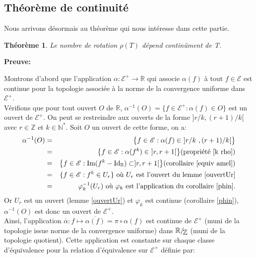 \documentclass[11pt,a4 paper]{article}
\newtheorem{theoreme}{Théorème}[section]
\newcommand{\Rbb}{\mathbb{R}}
\newcommand*{\EnsembleQuotient}[2]%
{\ensuremath{%
		#1/\!\raisebox{-.65ex}{\ensuremath{\mathcal{#2}}}}}
\newenvironment{thm}{\begin{box_thm}\begin{theoreme}}{\end{theoreme}\end{box_thm}}
\begin{document}
\subsection{Théorème de continuité}
Nous arrivons désormais au théorème qui nous intéresse dans cette partie.

\begin{thm}
	Le nombre de rotation $\rho(T)$ dépend continûment de T.
\end{thm}

	\textbf{Preuve:}
	\par Montrons d'abord que l'application $\alpha: \mathcal{E}^+ \to \mathbb{R}$ qui associe $\alpha(f)$ à tout $f \in \mathcal{E}$ est continue pour la topologie associée à la norme de la convergence uniforme dans $\mathcal{E}^+$.\\
	Vérifions que pour tout ouvert $O$ de $\mathbb{R}$, $\alpha^{-1}(O)= \lbrace f \in \mathcal{E}^+: \alpha(f) \in O\rbrace$ est un ouvert de $ \mathcal{E}^+ $. On peut se restreindre aux ouverts de la forme $]r/k,(r+1)/k[$ avec $r \in \mathbb{Z}$ et $k \in \mathbb{N}^*$. Soit $O$ un ouvert de cette forme, on a:
	\begin{eqnarray*}
		\alpha^{-1}(O)&=&\big\lbrace f \in \mathcal{E}: \alpha(f) \in \ ]r/k \ , (r+1)/k[ \big\rbrace \\
		&=& \big\lbrace f \in \mathcal{E}: \alpha(f^k) \in \ ]r , r+1 [ \big\rbrace (\text{propriété } \ref{k rho})\\
		&=& \big\lbrace f \in \mathcal{E}: \text{Im}(f^k - \mathrm{Id_{\mathbb{R}}}) \subset ]r,r+1[ \big\rbrace (\text{corollaire } \ref{equiv amel})\\
		&=& \lbrace  f \in \mathcal{E}: f^k \in U_r \rbrace \text{ où } U_r \text{ est l'ouvert du lemme } \ref{ouvertUr}\\
		&=& \varphi_k^{-1}(U_r) \text{ où }\varphi_k \text{ est l'application du corollaire } \ref{phin}.
	\end{eqnarray*}
	Or $U_r$ est un ouvert (lemme \ref{ouvertUr}) et $\varphi_k$ est continue (corollaire \ref{phin}), $\alpha^{-1}(O)$ est donc un ouvert de $\mathcal{E}^+$. \\

	
	Ainsi, l'application $\overline{\alpha}:f\mapsto \overline{\alpha(f)}= \pi\circ \alpha (f)$ est continue de $\mathcal{E}^+$ (muni de la topologie issue norme de la convergence uniforme) dans $\EnsembleQuotient{\Rbb}{\mathbb{Z}}$ (muni de la topologie quotient). Cette application est constante sur chaque classe d'équivalence pour la relation d'équivalence sur $\mathcal{E}^+$ définie par:
	
\end{document}

